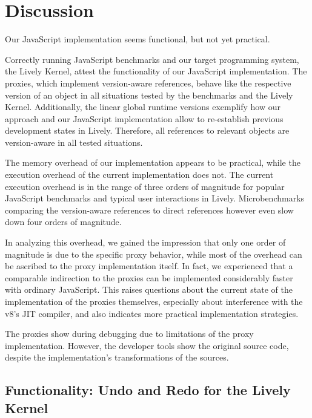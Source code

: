 \chapter{Discussion} \label{sec:DISCUSSION}

Our JavaScript implementation seems functional, but not yet practical.

Correctly running JavaScript benchmarks and our target programming system, the Lively Kernel, attest the functionality of our JavaScript implementation.
The proxies, which implement version-aware references, behave like the respective version of an object in all situations tested by the benchmarks and the Lively Kernel.
Additionally, the linear global runtime versions exemplify how our approach and our JavaScript implementation allow to re-establish previous development states in Lively.
Therefore, all references to relevant objects are version-aware in all tested situations.

The memory overhead of our implementation appears to be practical, while the execution overhead of the current implementation does not.
The current execution overhead is in the range of three orders of magnitude for popular JavaScript benchmarks and typical user interactions in Lively.
Microbenchmarks comparing the version-aware references to direct references however even slow down four orders of magnitude.

In analyzing this overhead, we gained the impression that only one order of magnitude is due to the specific proxy behavior, while most of the overhead can be ascribed to the proxy implementation itself.
In fact, we experienced that a comparable indirection to the proxies can be implemented considerably faster with ordinary JavaScript.
This raises questions about the current state of the implementation of the proxies themselves, especially about interference with the v8's JIT compiler, and also indicates more practical implementation strategies.

The proxies show during debugging due to limitations of the proxy implementation.
However, the developer tools show the original source code, despite the implementation's transformations of the sources.



\section{Functionality: Undo and Redo for the Lively Kernel}

